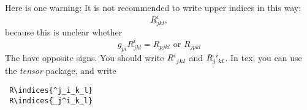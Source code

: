 \documentclass[12pt]{article}
\begin{document}
Here is one warning: It is not recommended to write upper indices in this way: \[
  R_{jkl}^i
,\] because this is unclear whether \[
  g_{pi}R_{jkl}^i=R_{pjkl}\text{ or }R_{jpkl}
\] The have opposite signs. You should write \(R\indices{^i_{jkl}}\) and
\(R\indices{_j^i_{kl}}\). In tex, you can use the \emph{tensor} package, and
write
\begin{verbatim}
 R\indices{^j_i_k_l}
 R\indices{_j^i_k_l}
\end{verbatim}
\end{document}
